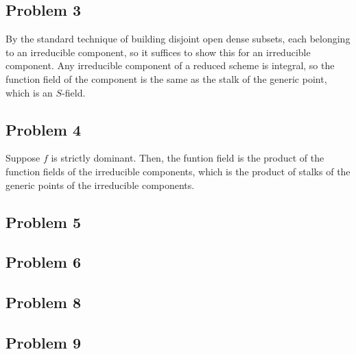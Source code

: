 \documentclass{article}
\theoremstyle{definition}
\theoremstyle{definition}
\theoremstyle{definition}
\theoremstyle{definition}
\theoremstyle{definition}
\theoremstyle{definition}
\theoremstyle{definition}
\begin{document}
\subsection*{Problem 3}
By the standard technique of building disjoint open dense subsets, each belonging to an irreducible component, so it suffices to show this for an irreducible component. Any irreducible component of a reduced scheme is integral, so the function field of the component is the same as the stalk of the generic point, which is an $S$-field. 


\subsection*{Problem 4}
Suppose $f$ is strictly dominant. Then, the funtion field is the product of the function fields of the irreducible components, which is the product of stalks of the generic points of the irreducible components. 



\subsection*{Problem 5}


\subsection*{Problem 6}



\subsection*{Problem 8}



\subsection*{Problem 9}
\end{document}
